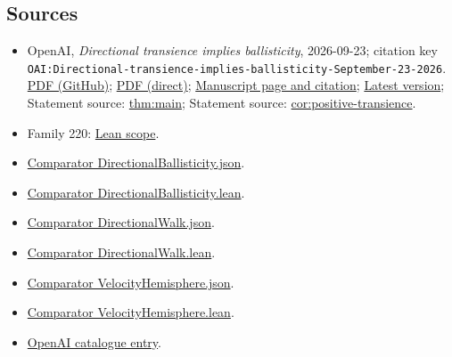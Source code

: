 \documentclass[11pt]{article}
\begin{document}
\subsection{Sources}
\begin{itemize}
\item OpenAI, \emph{Directional transience implies ballisticity}, 2026-09-23; citation key \texttt{OAI:Directional-transience-implies-ballisticity-September-23-2026}. \href{https://github.com/openai/math/blob/adc7f1241b42e322a6451854ab7e4b4c146bf78a/preprints/Directional-transience-implies-ballisticity-September-23-2026/paper.pdf}{PDF (GitHub)}; \href{https://github.com/openai/math/raw/adc7f1241b42e322a6451854ab7e4b4c146bf78a/preprints/Directional-transience-implies-ballisticity-September-23-2026/paper.pdf}{PDF (direct)}; \href{https://github.com/openai/math/blob/adc7f1241b42e322a6451854ab7e4b4c146bf78a/preprints/Directional-transience-implies-ballisticity-September-23-2026/README.md}{Manuscript page and citation}; \href{https://github.com/openai/math/blob/main/preprints/Directional-transience-implies-ballisticity-September-23-2026/paper.pdf}{Latest version}; Statement source: \href{https://github.com/openai/math/blob/adc7f1241b42e322a6451854ab7e4b4c146bf78a/preprints/Directional-transience-implies-ballisticity-September-23-2026/build/01-introduction.tex\#L50}{thm:main}; Statement source: \href{https://github.com/openai/math/blob/adc7f1241b42e322a6451854ab7e4b4c146bf78a/preprints/Directional-transience-implies-ballisticity-September-23-2026/build/01-introduction.tex\#L205}{cor:positive-transience}.
\item Family 220: \href{https://github.com/openai/math/blob/adc7f1241b42e322a6451854ab7e4b4c146bf78a/lean/docs/220.md}{Lean scope}.
\item \href{https://github.com/openai/math/blob/adc7f1241b42e322a6451854ab7e4b4c146bf78a/lean/ComparatorChallenges/DirectionalBallisticity.json}{Comparator DirectionalBallisticity.json}.
\item \href{https://github.com/openai/math/blob/adc7f1241b42e322a6451854ab7e4b4c146bf78a/lean/ComparatorChallenges/DirectionalBallisticity.lean}{Comparator DirectionalBallisticity.lean}.
\item \href{https://github.com/openai/math/blob/adc7f1241b42e322a6451854ab7e4b4c146bf78a/lean/ComparatorChallenges/DirectionalWalk.json}{Comparator DirectionalWalk.json}.
\item \href{https://github.com/openai/math/blob/adc7f1241b42e322a6451854ab7e4b4c146bf78a/lean/ComparatorChallenges/DirectionalWalk.lean}{Comparator DirectionalWalk.lean}.
\item \href{https://github.com/openai/math/blob/adc7f1241b42e322a6451854ab7e4b4c146bf78a/lean/ComparatorChallenges/VelocityHemisphere.json}{Comparator VelocityHemisphere.json}.
\item \href{https://github.com/openai/math/blob/adc7f1241b42e322a6451854ab7e4b4c146bf78a/lean/ComparatorChallenges/VelocityHemisphere.lean}{Comparator VelocityHemisphere.lean}.
\item \href{https://github.com/openai/math/blob/adc7f1241b42e322a6451854ab7e4b4c146bf78a/CONTENTS.md}{OpenAI catalogue entry}.
\end{itemize}
\end{document}
